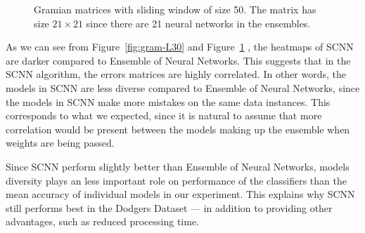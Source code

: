 \documentclass[conference]{IEEEtran}
\begin{document}
		\begin{figure}[H]
			\centering
			\caption{ Gramian matrices  with sliding window of size 50. The matrix has size $21 \times 21$ since there are 21 neural networks in the ensembles. }
			\label{fig:gram-L50}%
		\end{figure}
	
	As we can see from Figure~\ref{fig:gram-L30} and Figure~\ref{fig:gram-L50} , the heatmaps of SCNN are darker compared to Ensemble of Neural Networks. This suggests that in the SCNN algorithm, the errors matrices are highly correlated. In other words, the models in SCNN are less diverse  compared to Ensemble of Neural Networks, since the models in SCNN make more mistakes on the same data instances. This corresponds to what we expected, since it is natural to assume that more correlation would be present between the models making up the ensemble when weights are being passed.
	
	Since SCNN perform slightly better than Ensemble of Neural Networks, models diversity plays an less important role on performance of the classifiers than the mean accuracy of individual models in our experiment. This explains why SCNN still performs best in the Dodgers Dataset --- in addition to providing other advantages, such as reduced processing time. 
		
\end{document}

